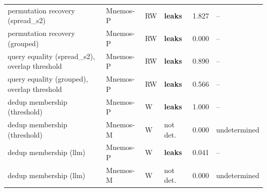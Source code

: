 \begin{table}[t]
\begin{tabular}{llllrl}
permutation recovery (spread\_s2) & Mnemos-P & RW & \textbf{leaks} & 1.827 & -- \\
permutation recovery (grouped) & Mnemos-P & RW & \textbf{leaks} & 0.000 & -- \\
query equality (spread\_s2), overlap threshold & Mnemos-P & RW & \textbf{leaks} & 0.890 & -- \\
query equality (grouped), overlap threshold & Mnemos-P & RW & \textbf{leaks} & 0.566 & -- \\
dedup membership (threshold) & Mnemos-P & W & \textbf{leaks} & 1.000 & -- \\
dedup membership (threshold) & Mnemos-M & W & not det. & 0.000 & undetermined \\
dedup membership (llm) & Mnemos-P & W & \textbf{leaks} & 0.041 & -- \\
dedup membership (llm) & Mnemos-M & W & not det. & 0.000 & undetermined \\
\bottomrule
\end{tabular}
\end{table}
